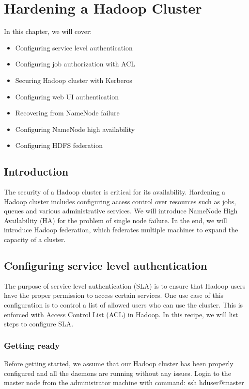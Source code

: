 \chapter{Hardening a Hadoop Cluster}\label{chap:5}
In this chapter, we will cover:
\begin{itemize}
  \item Configuring service level authentication
  \item Configuring job authorization with ACL
  \item Securing Hadoop cluster with Kerberos
  \item Configuring web UI authentication
  \item Recovering from NameNode failure
  \item Configuring NameNode high availability
  \item Configuring HDFS federation
\end{itemize}

\section{Introduction}
The security of a Hadoop cluster is critical for its availability. Hardening a Hadoop cluster includes configuring access control over resources such as jobs, queues and various administrative services. We will introduce NameNode High Availability (HA) for the problem of single node failure. In the end, we will introduce Hadoop federation, which federates multiple machines to expand the capacity of a cluster.

\section{Configuring service level authentication}
The purpose of service level authentication (SLA) is to ensure that Hadoop users have the proper permission to access certain services. One use case of this configuration is to control a list of allowed users who can use the cluster. This is enforced with Access Control List (ACL) in Hadoop. In this recipe, we will list steps to configure SLA.

\subsection*{Getting ready}
Before getting started, we assume that our Hadoop cluster has been properly configured and all the daemons are running without any issues.
Login to the master node from the administrator machine with command:
ssh hduser@master

